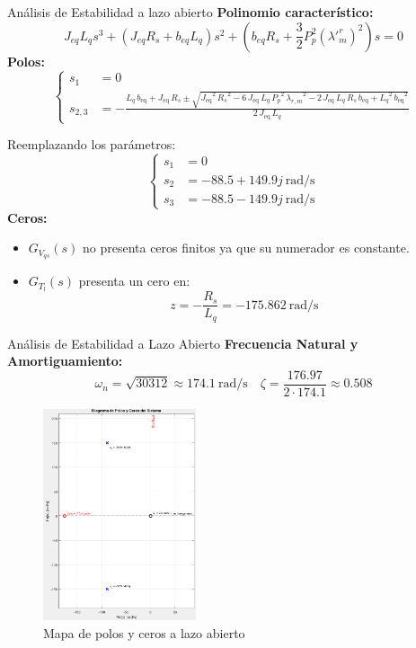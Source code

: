 \documentclass[12pt]{beamer}
\begin{document}
\begin{frame}{Análisis de Estabilidad a lazo abierto}\scriptsize
    \textbf{Polinomio característico:}
    \[
    J_{eq} L_q s^3 + (J_{eq} R_s + b_{eq} L_q) s^2 + \left(b_{eq} R_s + \frac{3}{2} P_p^2 (\lambda'^r_m)^2\right) s = 0
    \]
    \textbf{Polos:}
    \[
    \left\{
    \begin{aligned}
    s_1 &= 0 \\
    s_{2,3} &= -\frac{L_{q}\,b_{\mathrm{eq}} + J_{\mathrm{eq}}\,R_{s}\pm\sqrt{{J_{\mathrm{eq}}}^2\,{R_{s}}^2 - 6\,J_{\mathrm{eq}}\,L_{q}\,{P_{p}}^2\,{\lambda_{r,m}}^2 - 2\,J_{\mathrm{eq}}\,L_{q}\,R_{s}\,b_{\mathrm{eq}} + {L_{q}}^2\,{b_{\mathrm{eq}}}^2}}{2\,J_{\mathrm{eq}}\,L_{q}} 
    \end{aligned}
    \right.
    \]
    
    Reemplazando los parámetros:
    \[
    \left\{
    \begin{aligned}
    s_1 &= 0 \\
    s_2 &= -88.5 + 149.9j \ \text{rad/s} \\
    s_3 &= -88.5 - 149.9j \ \text{rad/s}
    \end{aligned}
    \right.
    \]
    \textbf{Ceros:}
    \begin{itemize}
    \item \( G_{V_{qs}}(s) \) no presenta ceros finitos ya que su numerador es constante.
    \item \( G_{T_l}(s) \) presenta un cero en:
    \[
    z = -\frac{R_s}{L_q} = -175.862 \ \text{rad/s}
    \]
\end{itemize}
\end{frame}

\begin{frame}{Análisis de Estabilidad a Lazo Abierto}\scriptsize
    \textbf{Frecuencia Natural y Amortiguamiento:}
    \[
    \omega_n = \sqrt{30312} \approx 174.1 \ \text{rad/s} \quad \zeta = \frac{176.97}{2 \cdot 174.1} \approx 0.508 
    \]
    \begin{figure}[H]
    \centering
    \includegraphics[width=0.4\textwidth]{Imagenes/mapa_polos_ceros.png}
    \caption{Mapa de polos y ceros a lazo abierto}
    \label{fig:polos_ceros}
    \end{figure}
\end{frame}
\end{document}
